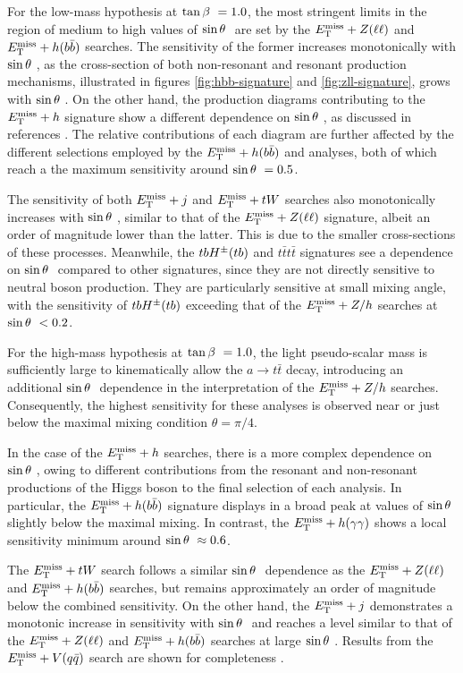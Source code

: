 For the low-mass hypothesis at $\tan\beta~=1.0$, the most stringent limits in the region of medium to high values of $\sin\theta~$ are set by the $E_{\mathrm{T}}^{\mathrm{miss}}+Z(\ell\ell)$ and $E_{\mathrm{T}}^{\mathrm{miss}}+h(b\bar{b})$ searches. The sensitivity of the former increases monotonically with $\sin\theta~$, as the cross-section of both non-resonant and resonant production mechanisms, illustrated in figures \ref{fig:hbb-signature} and \ref{fig:zll-signature}, grows with $\sin\theta~$. On the other hand, the production diagrams contributing to the $E_{\mathrm{T}}^{\mathrm{miss}}+h$ signature show a different dependence on $\sin\theta~$, as discussed in references \cite{Bauer:2017ota,EXOT-2017-32}. The relative contributions of each diagram are further affected by the different selections employed by the $E_{\mathrm{T}}^{\mathrm{miss}}+h(b\bar{b})$ and \monohgamgam analyses, both of which reach a the maximum sensitivity around $\sin\theta~=0.5$. 

The sensitivity of both $E_{\mathrm{T}}^{\mathrm{miss}}+j$ and $E_{\mathrm{T}}^{\mathrm{miss}}+tW$ searches also monotonically increases with $\sin\theta~$, similar to that of the $E_{\mathrm{T}}^{\mathrm{miss}}+Z(\ell\ell)$ signature, albeit an order of magnitude lower than the latter. This is due to the smaller cross-sections of these processes. Meanwhile, the $tbH^{\pm}(tb)$ and $t\bar{t}t\bar{t}$ signatures see a dependence on $\sin\theta~$ compared to other signatures, since they are not directly sensitive to neutral boson production. They are particularly sensitive at small mixing angle, with the sensitivity of $tbH^{\pm}(tb)$ exceeding that of the $E_{\mathrm{T}}^{\mathrm{miss}}+Z/h$ searches at $\sin\theta~ < 0.2$. 

For the high-mass hypothesis at $\tan\beta~=1.0$, the light pseudo-scalar mass is sufficiently large to kinematically allow the $a\rightarrow t\bar{t}$ decay, introducing an additional $\sin\theta~$ dependence in the interpretation of the $E_{\mathrm{T}}^{\mathrm{miss}}+Z/h$ searches. Consequently, the highest sensitivity for these analyses is observed near or just below the maximal mixing condition $\theta=\pi/4$. 

In the case of the $E_{\mathrm{T}}^{\mathrm{miss}} +h$ searches, there is a more complex dependence on $\sin\theta~$, owing to different contributions from the resonant and non-resonant productions of the Higgs boson to the final selection of each analysis. In particular, the $E_{\mathrm{T}}^{\mathrm{miss}} +h(b\bar{b})$ signature displays in a broad peak at values of $\sin\theta~$ slightly below the maximal mixing. In contrast, the $E_{\mathrm{T}}^{\mathrm{miss}} +h(\gamma\gamma)$ shows a local sensitivity minimum around $\sin\theta~\approx 0.6$. 

The $E_{\mathrm{T}}^{\mathrm{miss}} + tW$ search follows a similar $\sin\theta~$ dependence as the $E_{\mathrm{T}}^{\mathrm{miss}}+Z(\ell\ell)$ and $E_{\mathrm{T}}^{\mathrm{miss}}+h(b\bar{b})$ searches, but remains approximately an order of magnitude below the combined sensitivity. On the other hand, the $E_{\mathrm{T}}^{\mathrm{miss}}+j$ demonstrates a monotonic increase in sensitivity with $\sin\theta~$ and reaches a level similar to that of the $E_{\mathrm{T}}^{\mathrm{miss}}+Z(\ell\ell)$ and $E_{\mathrm{T}}^{\mathrm{miss}}+h(b\bar{b})$ searches at large $\sin\theta~$. Results from the $E_{\mathrm{T}}^{\mathrm{miss}}+V(q\bar{q})$ search are shown for completeness \cite{EXOT-2017-32}.

